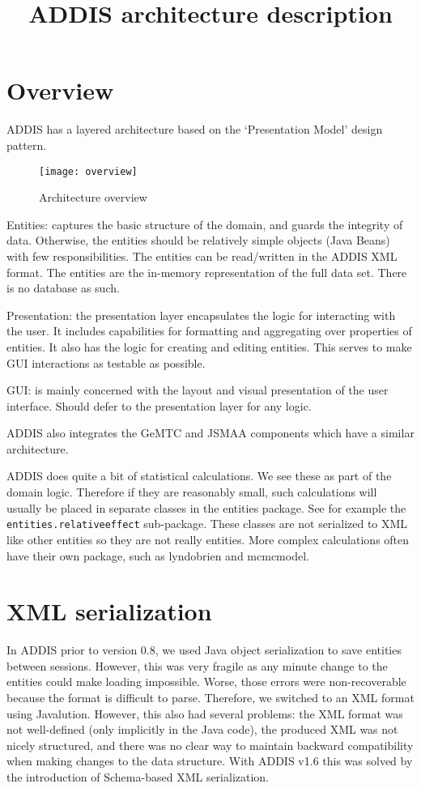 \documentclass[a4paper]{article}
\title{ADDIS architecture description}
\begin{document}
\maketitle

\section{Overview}

ADDIS has a layered architecture based on the `Presentation Model' design pattern.

\begin{figure}[h]
\centering
\texttt{[image: overview]}
\caption{Architecture overview}
\end{figure}

Entities: captures the basic structure of the domain, and guards the integrity of data.
Otherwise, the entities should be relatively simple objects (Java Beans) with few responsibilities.
The entities can be read/written in the ADDIS XML format.
The entities are the in-memory representation of the full data set.
There is no database as such.

Presentation: the presentation layer encapsulates the logic for interacting with the user.
It includes capabilities for formatting and aggregating over properties of entities.
It also has the logic for creating and editing entities.
This serves to make GUI interactions as testable as possible.

GUI: is mainly concerned with the layout and visual presentation of the user interface.
Should defer to the presentation layer for any logic.

ADDIS also integrates the GeMTC and JSMAA components which have a similar architecture.

ADDIS does quite a bit of statistical calculations.
We see these as part of the domain logic.
Therefore if they are reasonably small, such calculations will usually be placed in separate classes in the entities package.
See for example the {\tt entities.relativeeffect} sub-package.
These classes are not serialized to XML like other entities so they are not really entities.
More complex calculations often have their own package, such as lyndobrien and mcmcmodel.

\section{XML serialization}

In ADDIS prior to version 0.8, we used Java object serialization to save entities between sessions.
However, this was very fragile as any minute change to the entities could make loading impossible.
Worse, those errors were non-recoverable because the format is difficult to parse.
Therefore, we switched to an XML format using Javalution.
However, this also had several problems: the XML format was not well-defined (only implicitly in the Java code), the produced XML was not nicely structured, and there was no clear way to maintain backward compatibility when making changes to the data structure.
With ADDIS v1.6 this was solved by the introduction of Schema-based XML serialization.
\end{document}
